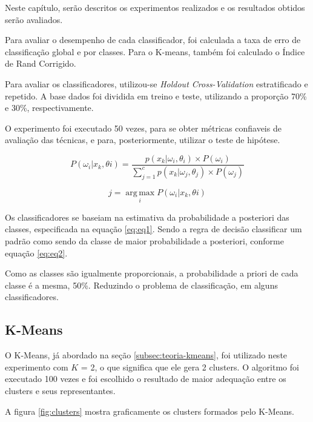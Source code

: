 
Neste capítulo, serão descritos os experimentos realizados e os resultados obtidos serão avaliados.

Para avaliar o desempenho de cada classificador, foi calculada a taxa de erro de classificação global e por classes. Para o K-means, também foi calculado o Índice de Rand Corrigido.

Para avaliar os classificadores, utilizou-se \textit{Holdout Cross-Validation} estratificado e repetido. A base dados foi dividida em treino e teste, utilizando a proporção 70\% e 30\%, respectivamente.

O experimento foi executado 50 vezes, para se obter métricas confiaveis de avaliação das técnicas, e para, posteriormente, utilizar o teste de hipótese.

\begin{equation}
\label{eq:eq1}
P(\omega_{i} | x_{k},\theta{i}) = \dfrac{p(x_k| \omega_i, \theta_i) \times P(\omega_i)}{\sum_{j=1}^c p(x_k | \omega_j, \theta_j) \times P(\omega_j)}
\end{equation}

\begin{equation}
\label{eq:eq2}
j = \operatorname*{arg\,max}_i P(\omega_{i} | x_{k},\theta{i})
\end{equation}

Os classificadores se baseiam na estimativa da probabilidade a posteriori das classes, especificada na equação \ref{eq:eq1}. Sendo a regra de decisão classificar um padrão como sendo da classe de maior probabilidade a posteriori, conforme equação \ref{eq:eq2}.

Como as classes são igualmente proporcionais, a probabilidade a priori de cada classe é a mesma, 50\%. Reduzindo o problema de classificação, em alguns classificadores.

\subsection{K-Means}
\label{subsec:exp-kmeans}

O K-Means, já abordado na seção \ref{subsec:teoria-kmeans}, foi utilizado neste experimento com $K$ = 2, o que significa que ele gera 2 clusters. O algoritmo foi executado 100 vezes e foi escolhido o resultado de maior adequação entre os clusters e seus representantes.

A figura \ref{fig:clusters} mostra graficamente os clusters formados pelo K-Means.

